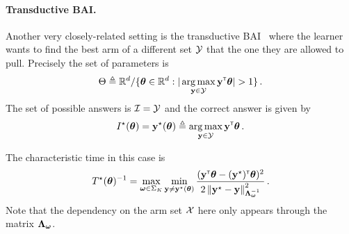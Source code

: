 \paragraph{Transductive BAI.}\label{sec:lgc.formulation.examples.transductive}
Another very closely-related setting is the transductive BAI~\citep{fiez2019transductive} where the learner wants to find the best arm of a different set $\mathcal{Y}$ that the one they are allowed to pull. Precisely the set of parameters is 
\[
    \Theta \eqdef \R^d/\{\btheta\in\R^d: |\argmax_{\by\in\cY} \by\transpose\btheta|>1\}\,.
\]
The set of possible answers is $\mathcal{I} = \mathcal{Y}$ and the correct answer is given by 
\[
    I^\star({\boldsymbol \theta}) = {\bf y}^\star({\boldsymbol \theta}) \triangleq \operatorname*{arg\,max}_{{\bf y}\in\mathcal{Y}} {\bf y}^\mathsf{\scriptscriptstyle T}{\boldsymbol \theta}\,.
\]

The characteristic time in this case is
\[
    T^{\star}({\boldsymbol \theta})^{-1} = \max_{{\boldsymbol \omega}\in\Sigma_K} \min_{{\bf y}\neq {\bf y}^\star({\boldsymbol \theta})} \frac{({\bf y}^\mathsf{\scriptscriptstyle T}{\boldsymbol \theta}-({\bf y}^\star)^\mathsf{\scriptscriptstyle T}{\boldsymbol \theta})^2}{2\left\lVert{\bf y}^\star - {\bf y}\right\rVert^2_{{\boldsymbol \Lambda}_{{\boldsymbol \omega}}^{-1}}}\,.
\]
Note that the dependency on the arm set $\mathcal{X}$ here only appears through the matrix ${\boldsymbol \Lambda}_{{\boldsymbol \omega}}$.


